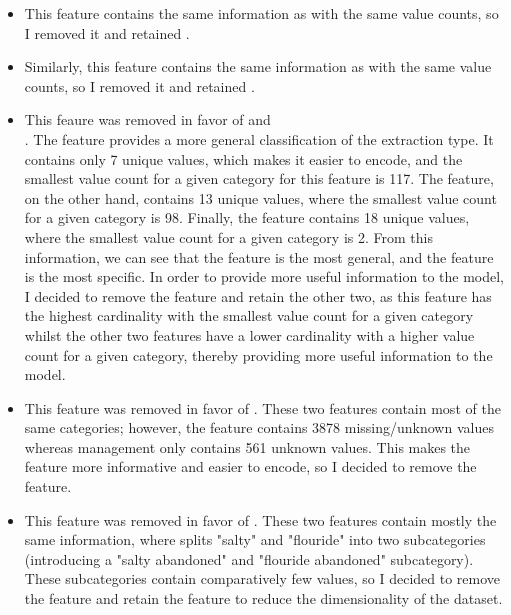 \documentclass{article}
\begin{document}
\begin{itemize}
  \item {} This feature contains the same information as  with the same value counts, so I removed it and retained .
  \item {} Similarly, this feature contains the same information as  with the same value counts, so I removed it and retained .
  \item {} This feaure was removed in favor of  and \\ . The  feature provides a more general classification of the extraction type. It contains only 7 unique values, which makes it easier to encode, and the smallest value count for a given category for this feature is 117. The  feature, on the other hand, contains 13 unique values, where the smallest value count for a given category is 98. Finally, the  feature contains 18 unique values, where the smallest value count for a given category is 2. From this information, we can see that the  feature is the most general, and the  feature is the most specific. In order to provide more useful information to the model, I decided to remove the  feature and retain the other two, as this feature has the highest cardinality with the smallest value count for a given category whilst the other two features have a lower cardinality with a higher value count for a given category, thereby providing more useful information to the model.
  \item {} This feature was removed in favor of . These two features contain most of the same categories; however, the  feature contains 3878 missing/unknown values whereas management only contains 561 unknown values. This makes the  feature more informative and easier to encode, so I decided to remove the  feature.
  \item {} This feature was removed in favor of . These two features contain mostly the same information, where  splits "salty" and "flouride" into two subcategories (introducing a "salty abandoned" and "flouride abandoned" subcategory). These subcategories contain comparatively few values, so I decided to remove the  feature and retain the  feature to reduce the dimensionality of the dataset.

\end{itemize}
\end{document}
